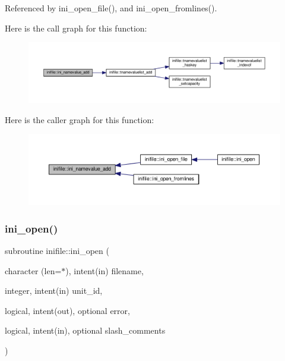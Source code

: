 Referenced by ini\+\_\+open\+\_\+file(), and ini\+\_\+open\+\_\+fromlines().

Here is the call graph for this function\+:
\nopagebreak
\begin{figure}[H]
\begin{center}
\leavevmode
\includegraphics[width=350pt]{namespaceinifile_a609f356a961dccd80c9ae97cef1ec582_cgraph}
\end{center}
\end{figure}
Here is the caller graph for this function\+:
\nopagebreak
\begin{figure}[H]
\begin{center}
\leavevmode
\includegraphics[width=350pt]{namespaceinifile_a609f356a961dccd80c9ae97cef1ec582_icgraph}
\end{center}
\end{figure}
\mbox{\label{namespaceinifile_a02e6bd0abca420cf13df98658ac047ba}} 
\subsubsection{\texorpdfstring{ini\+\_\+open()}{ini\_open()}}
{\footnotesize\ttfamily subroutine inifile\+::ini\+\_\+open (\begin{DoxyParamCaption}\item[{character (len=$\ast$), intent(in)}]{filename,  }\item[{integer, intent(in)}]{unit\+\_\+id,  }\item[{logical, intent(out), optional}]{error,  }\item[{logical, intent(in), optional}]{slash\+\_\+comments }\end{DoxyParamCaption})}



